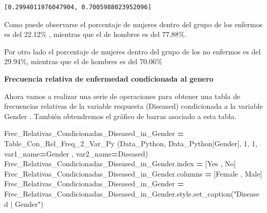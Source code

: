 \documentclass[
  11pt,
  a4paper,
]{article}
\newenvironment{Shaded}{\begin{snugshade}}{\end{snugshade}}
\newcommand{\DecValTok}[1]{\textcolor[rgb]{0.00,0.00,0.81}{#1}}
\newcommand{\NormalTok}[1]{#1}
\newcommand{\OperatorTok}[1]{\textcolor[rgb]{0.81,0.36,0.00}{\textbf{#1}}}
\newcommand{\StringTok}[1]{\textcolor[rgb]{0.31,0.60,0.02}{#1}}
\begin{document}
\begin{verbatim}
[0.2994011976047904, 0.7005988023952096]
\end{verbatim}

Como puede observarse el porcentaje de mujeres dentro del grupo de los
enfermos es del 22.12\% , mientras que el de hombres es del 77.88\%.

Por otro lado el porcentaje de mujeres dentro del grupo de los no
enfermos es del 29.94\%, mientras que el de hombres es del 70.06\%

\vspace{0.5cm}

\textbf{Frecuencia relativa de enfermedad condicionada al genero}

Ahora vamos a realizar una serie de operaciones para obtener una tabla
de frecuencias relativas de la variable respuesta (Diseased)
condicionada a la variable Gender . También obtendremos el gráfico de
barras asociado a esta tabla.

\begin{Shaded}
\begin{Highlighting}[]
\NormalTok{Frec\_Relativas\_Condicionadas\_Diseased\_in\_Gender }\OperatorTok{=}\NormalTok{ Table\_Con\_Rel\_Freq\_2\_Var\_Py (Data\_Python, Data\_Python[}\StringTok{\textquotesingle{}Gender\textquotesingle{}}\NormalTok{], }\DecValTok{1}\NormalTok{, }\DecValTok{1}\NormalTok{, var1\_name}\OperatorTok{=}\StringTok{\textquotesingle{}Gender\textquotesingle{}}\NormalTok{ , var2\_name}\OperatorTok{=}\StringTok{\textquotesingle{}Diseased\textquotesingle{}}\NormalTok{)}
\NormalTok{Frec\_Relativas\_Condicionadas\_Diseased\_in\_Gender.index }\OperatorTok{=}\NormalTok{ [}\StringTok{\textquotesingle{}Yes\textquotesingle{}}\NormalTok{ , }\StringTok{\textquotesingle{}No\textquotesingle{}}\NormalTok{]}
\NormalTok{Frec\_Relativas\_Condicionadas\_Diseased\_in\_Gender.columns }\OperatorTok{=}\NormalTok{ [}\StringTok{\textquotesingle{}Female\textquotesingle{}}\NormalTok{ , }\StringTok{\textquotesingle{}Male\textquotesingle{}}\NormalTok{]}
\NormalTok{Frec\_Relativas\_Condicionadas\_Diseased\_in\_Gender }\OperatorTok{=}\NormalTok{ Frec\_Relativas\_Condicionadas\_Diseased\_in\_Gender.style.set\_caption(}\StringTok{"Diseased | Gender"}\NormalTok{)}
\end{Highlighting}
\end{Shaded}
\end{document}
